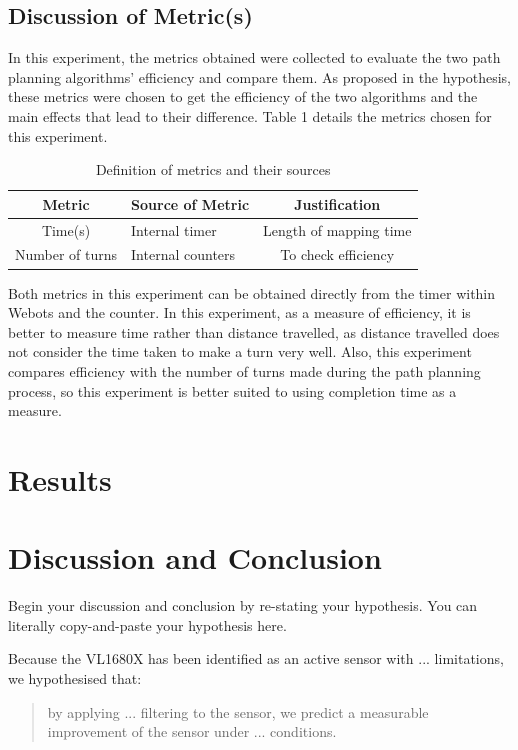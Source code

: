 \documentclass[conference]{IEEEtran}
\begin{document}
\subsection{Discussion of Metric(s)}
In this experiment, the metrics obtained were collected to evaluate the two path planning algorithms' efficiency and compare them. As proposed in the hypothesis, these metrics were chosen to get the efficiency of the two algorithms and the main effects that lead to their difference. Table 1 details the metrics chosen for this experiment.

\begin{table}[htbp]
\centering
\caption{Definition of metrics and their sources}
\label{Table1}
\begin{tabular}{c|l|c}
\hline
Metric                               & \multicolumn{1}{c|}{Source of Metric} & Justification          \\ \hline
Time(s)                              & Internal timer                        & Length of mapping time \\ \hline
\multicolumn{1}{l|}{Number of turns} & Internal counters                     & To check efficiency    \\ \hline
\end{tabular}
\end{table}

Both metrics in this experiment can be obtained directly from the timer within Webots and the counter. In this experiment, as a measure of efficiency, it is better to measure time rather than distance travelled, as distance travelled does not consider the time taken to make a turn very well. Also, this experiment compares efficiency with the number of turns made during the path planning process, so this experiment is better suited to using completion time as a measure.


\section{Results}


\section{Discussion and Conclusion}

Begin your discussion and conclusion by re-stating your hypothesis.  You can literally copy-and-paste your hypothesis here.  

Because the VL1680X has been identified as an active sensor with ... limitations, we hypothesised that:
\begin{quote}
    by applying ... filtering to the sensor, we predict a measurable improvement of the sensor under ... conditions.  
\end{quote}


 

\end{document}
